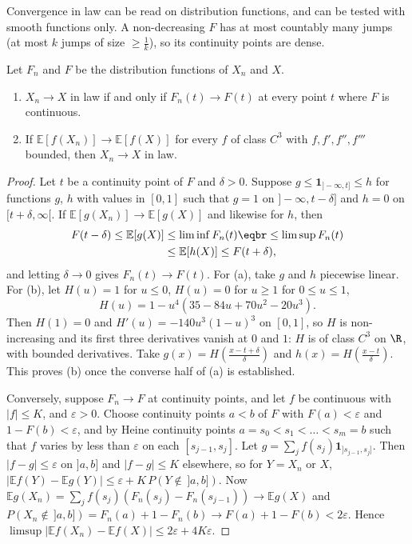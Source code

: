 Convergence in law can be read on distribution functions, and can be tested with smooth functions only. A
non-decreasing $F$ has at most countably many jumps (at most $k$ jumps of size $\ge\frac1k$), so its continuity points are dense.

\begin{proposition}\label{prop:law}
Let $F_n$ and $F$ be the distribution functions of $X_n$ and $X$.
\begin{enumerate}[label=(\alph*)]
\item $X_n\to X$ in law if and only if $F_n(t)\to F(t)$ at every point $t$ where $F$ is continuous.
\item If $\mathbb E[f(X_n)]\to\mathbb E[f(X)]$ for every $f$ of class $C^3$ with $f,f',f'',f'''$ bounded, then $X_n\to X$ in law.
\end{enumerate}
\end{proposition}
\begin{proof}
Let $t$ be a continuity point of $F$ and $\delta>0$. Suppose $g\le\mathbf 1_{]-\infty,t]}\le h$ for functions $g$, $h$ with values in $[0,1]$ such that $g=1$ on
$]-\infty,t-\delta]$ and $h=0$ on $[t+\delta,\infty[$. If $\mathbb E[g(X_n)]\to\mathbb E[g(X)]$ and likewise for $h$, then
\[
\begin{aligned}F(t-\delta)\le\mathbb E[g(X)]&\le\liminf F_n(t)\eqbr\le\limsup F_n(t)\\&\le\mathbb E[h(X)]\le F(t+\delta),\end{aligned}
\]
and letting $\delta\to0$ gives $F_n(t)\to F(t)$. For (a), take $g$ and $h$ piecewise linear. For (b), let $H(u)=1$ for $u\le0$, $H(u)=0$ for $u\ge1$ for $0\le u\le1$,
\[
H(u)=1-u^4(35-84u+70u^2-20u^3).
\]
Then $H(1)=0$ and $H'(u)=-140u^3(1-u)^3$ on $[0,1]$, so $H$ is non-increasing and its first three derivatives vanish at $0$ and $1$: $H$ is of
class $C^3$ on $\R$, with bounded derivatives. Take $g(x)=H(\frac{x-t+\delta}\delta)$ and $h(x)=H(\frac{x-t}\delta)$. This proves (b) once the converse half of (a) is
established.

Conversely, suppose $F_n\to F$ at continuity points, and let $f$ be continuous with $|f|\le K$, and $\varepsilon>0$. Choose continuity points $a<b$
of $F$ with $F(a)<\varepsilon$ and $1-F(b)<\varepsilon$, and by Heine continuity points $a=s_0<s_1<\dots<s_m=b$ such that $f$ varies by less than $\varepsilon$ on each
$[s_{j-1},s_j]$. Let $g=\sum_jf(s_j)\mathbf 1_{]s_{j-1},s_j]}$. Then $|f-g|\le\varepsilon$ on $]a,b]$ and $|f-g|\le K$ elsewhere, so for $Y=X_n$ or $X$,
$|\mathbb E f(Y)-\mathbb E g(Y)|\le\varepsilon+K\,P(Y\notin\,]a,b])$. Now $\mathbb E g(X_n)=\sum_jf(s_j)(F_n(s_j)-F_n(s_{j-1}))\to\mathbb E g(X)$ and
$P(X_n\notin\,]a,b])=F_n(a)+1-F_n(b)\to F(a)+1-F(b)<2\varepsilon$. Hence $\limsup|\mathbb E f(X_n)-\mathbb E f(X)|\le2\varepsilon+4K\varepsilon$.
\end{proof}

